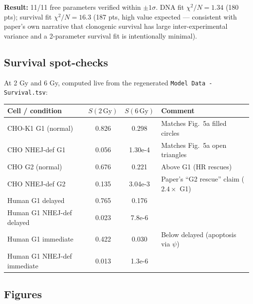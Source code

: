 \documentclass[11pt]{article}
\begin{document}
\textbf{Result:} 11/11 free parameters verified within $\pm 1\sigma$.
DNA fit $\chi^2/N = 1.34$ (180 pts); survival fit $\chi^2/N = 16.3$
(187 pts, high value expected --- consistent with paper's own narrative
that clonogenic survival has large inter-experimental variance and a
2-parameter survival fit is intentionally minimal).

\subsection{Survival spot-checks}

At 2 Gy and 6 Gy, computed live from the regenerated
\texttt{Model Data - Survival.tsv}:

\begin{longtable}{l c c l}
\toprule
Cell / condition & $S(2\,\text{Gy})$ & $S(6\,\text{Gy})$ & Comment \\
\midrule
\endhead
CHO-K1 G1 (normal)          & 0.826  & 0.298   & Matches Fig.\ 5a filled circles \\
CHO NHEJ-def G1             & 0.056  & 1.30e-4 & Matches Fig.\ 5a open triangles \\
CHO G2 (normal)             & 0.676  & 0.221   & Above G1 (HR rescues) \\
CHO NHEJ-def G2             & 0.135  & 3.04e-3 & Paper's ``G2 rescue'' claim ($2.4\times$ G1) \\
Human G1 delayed            & 0.765  & 0.176   & \\
Human G1 NHEJ-def delayed   & 0.023  & 7.8e-6  & \\
Human G1 immediate          & 0.422  & 0.030   & Below delayed (apoptosis via $\psi$) \\
Human G1 NHEJ-def immediate & 0.013  & 1.3e-6  & \\
\bottomrule
\end{longtable}

\subsection{Figures}
\end{document}
